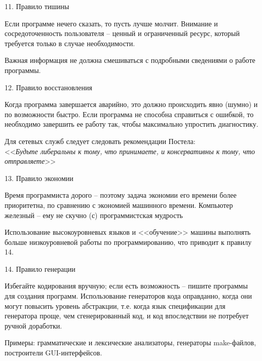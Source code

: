 \begin{frame}{11. Правило тишины}
	\begin{block}{Если программе нечего сказать,  то пусть лучше молчит.}
		\pause
		Внимание и сосредоточенность пользователя -- ценный и ограниченный ресурс,  который требуется только в случае необходимости.
	\end{block}
	\pause
	Важная информация не должна смешиваться с подробными сведениями о работе программы.
\end{frame}

\begin{frame}{12. Правило восстановления}
	\begin{block}{Когда программа завершается аварийно,  это должно происходить явно (шумно) и по возможности быстро.}
		\pause
		Если программа не способна справиться с ошибкой,  то необходимо завершить ее работу так,  чтобы максимально упростить диагностику.
	\end{block}
	\pause
	Для сетевых служб следует следовать рекомендации Постела:\\
	<<{\itshape Будьте либеральны к тому,  что принимаете,  и консервативны к тому,  что отправляете}>>
\end{frame}

\begin{frame}{13. Правило экономии}
	\begin{block}{Время программиста дорого -- поэтому задача экономии его времени более приоритетна,  по сравнению с экономией машинного времени.}
		\pause
		Компьютер железный -- ему не скучно (с) программистская мудрость
	\end{block}
	\pause
	Использование высокоуровневых языков и <<обучение>> машины выполнять больше низкоуровневой работы по программированию,  что приводит к правилу 14.
\end{frame}

\begin{frame}{14. Правило генерации}
	\begin{block}{Избегайте кодирования вручную; если есть возможность -- пишите программы для создания программ.}
		\pause
		Использование генераторов кода оправданно,  когда они могут повысить уровень абстракции,  
		т.е. когда язык спецификации для генератора проще,  чем сгенерированный код,  
		и код впоследствии не потребует ручной доработки.
	\end{block}
	\pause
	Примеры: грамматические и лексические анализаторы,  генераторы make-файлов,  построители GUI-интерфейсов.
\end{frame}

